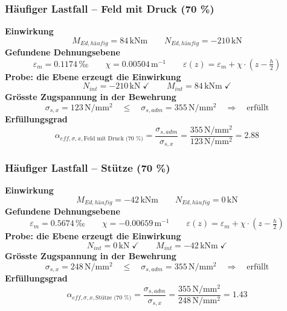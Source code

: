 \documentclass[11pt,a4paper]{article}
\begin{document}
\subsubsection{Häufiger Lastfall – Feld mit Druck (70 \%)}
\noindent\textbf{Einwirkung}
\begin{equation*}
M_{Ed,häufig} = 84\,\mathrm{kNm} \qquad N_{Ed,häufig} = -210\,\mathrm{kN}
\end{equation*}
\noindent\textbf{Gefundene Dehnungsebene}
\begin{equation*}
\varepsilon_m = 0.1174\,\text{‰} \qquad \chi = 0.00504\,\mathrm{m}^{-1} \qquad \varepsilon(z) = \varepsilon_m + \chi \cdot \left(z - \tfrac{h}{2}\right)
\end{equation*}
\noindent\textbf{Probe: die Ebene erzeugt die Einwirkung}
\begin{equation*}
N_{int} = -210\,\mathrm{kN} \;\checkmark \qquad M_{int} = 84\,\mathrm{kNm} \;\checkmark
\end{equation*}
\noindent\textbf{Grösste Zugspannung in der Bewehrung}
\begin{equation*}
\sigma_{s,x} = 123\,\mathrm{N}/\mathrm{mm}^{2} \quad \le \quad \sigma_{s,adm} = 355\,\mathrm{N}/\mathrm{mm}^{2} \quad \Rightarrow \quad \text{erfüllt}
\end{equation*}
\noindent\textbf{Erfüllungsgrad}
\begin{equation*}
\alpha_{eff,\sigma,x,\text{Feld mit Druck (70 \%)}} = \frac{\sigma_{s,adm}}{\sigma_{s,x}} = \frac{355\,\mathrm{N}/\mathrm{mm}^{2}}{123\,\mathrm{N}/\mathrm{mm}^{2}} = 2.88
\end{equation*}
\subsubsection{Häufiger Lastfall – Stütze (70 \%)}
\noindent\textbf{Einwirkung}
\begin{equation*}
M_{Ed,häufig} = -42\,\mathrm{kNm} \qquad N_{Ed,häufig} = 0\,\mathrm{kN}
\end{equation*}
\noindent\textbf{Gefundene Dehnungsebene}
\begin{equation*}
\varepsilon_m = 0.5674\,\text{‰} \qquad \chi = -0.00659\,\mathrm{m}^{-1} \qquad \varepsilon(z) = \varepsilon_m + \chi \cdot \left(z - \tfrac{h}{2}\right)
\end{equation*}
\noindent\textbf{Probe: die Ebene erzeugt die Einwirkung}
\begin{equation*}
N_{int} = 0\,\mathrm{kN} \;\checkmark \qquad M_{int} = -42\,\mathrm{kNm} \;\checkmark
\end{equation*}
\noindent\textbf{Grösste Zugspannung in der Bewehrung}
\begin{equation*}
\sigma_{s,x} = 248\,\mathrm{N}/\mathrm{mm}^{2} \quad \le \quad \sigma_{s,adm} = 355\,\mathrm{N}/\mathrm{mm}^{2} \quad \Rightarrow \quad \text{erfüllt}
\end{equation*}
\noindent\textbf{Erfüllungsgrad}
\begin{equation*}
\alpha_{eff,\sigma,x,\text{Stütze (70 \%)}} = \frac{\sigma_{s,adm}}{\sigma_{s,x}} = \frac{355\,\mathrm{N}/\mathrm{mm}^{2}}{248\,\mathrm{N}/\mathrm{mm}^{2}} = 1.43
\end{equation*}
\end{document}
